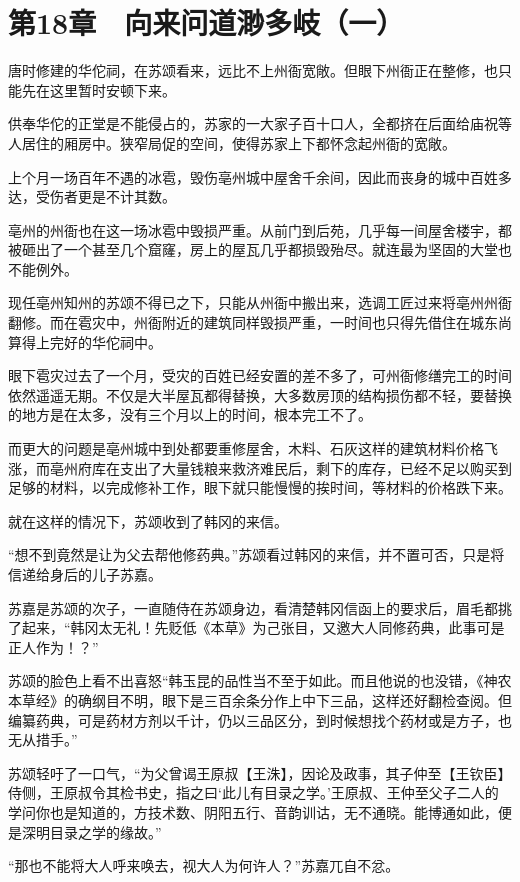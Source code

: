 \section{第18章　向来问道渺多岐（一）}

唐时修建的华佗祠，在苏颂看来，远比不上州衙宽敞。但眼下州衙正在整修，也只能先在这里暂时安顿下来。

供奉华佗的正堂是不能侵占的，苏家的一大家子百十口人，全都挤在后面给庙祝等人居住的厢房中。狭窄局促的空间，使得苏家上下都怀念起州衙的宽敞。

上个月一场百年不遇的冰雹，毁伤亳州城中屋舍千余间，因此而丧身的城中百姓多达，受伤者更是不计其数。

亳州的州衙也在这一场冰雹中毁损严重。从前门到后苑，几乎每一间屋舍楼宇，都被砸出了一个甚至几个窟窿，房上的屋瓦几乎都损毁殆尽。就连最为坚固的大堂也不能例外。

现任亳州知州的苏颂不得已之下，只能从州衙中搬出来，选调工匠过来将亳州州衙翻修。而在雹灾中，州衙附近的建筑同样毁损严重，一时间也只得先借住在城东尚算得上完好的华佗祠中。

眼下雹灾过去了一个月，受灾的百姓已经安置的差不多了，可州衙修缮完工的时间依然遥遥无期。不仅是大半屋瓦都得替换，大多数房顶的结构损伤都不轻，要替换的地方是在太多，没有三个月以上的时间，根本完工不了。

而更大的问题是亳州城中到处都要重修屋舍，木料、石灰这样的建筑材料价格飞涨，而亳州府库在支出了大量钱粮来救济难民后，剩下的库存，已经不足以购买到足够的材料，以完成修补工作，眼下就只能慢慢的挨时间，等材料的价格跌下来。

就在这样的情况下，苏颂收到了韩冈的来信。

“想不到竟然是让为父去帮他修药典。”苏颂看过韩冈的来信，并不置可否，只是将信递给身后的儿子苏嘉。

苏嘉是苏颂的次子，一直随侍在苏颂身边，看清楚韩冈信函上的要求后，眉毛都挑了起来，“韩冈太无礼！先贬低《本草》为己张目，又邀大人同修药典，此事可是正人作为！？”

苏颂的脸色上看不出喜怒“韩玉昆的品性当不至于如此。而且他说的也没错，《神农本草经》的确纲目不明，眼下是三百余条分作上中下三品，这样还好翻检查阅。但编纂药典，可是药材方剂以千计，仍以三品区分，到时候想找个药材或是方子，也无从措手。”

苏颂轻吁了一口气，“为父曾谒王原叔【王洙】，因论及政事，其子仲至【王钦臣】侍侧，王原叔令其检书史，指之曰‘此儿有目录之学。’王原叔、王仲至父子二人的学问你也是知道的，方技术数、阴阳五行、音韵训诂，无不通晓。能博通如此，便是深明目录之学的缘故。”

“那也不能将大人呼来唤去，视大人为何许人？”苏嘉兀自不忿。

